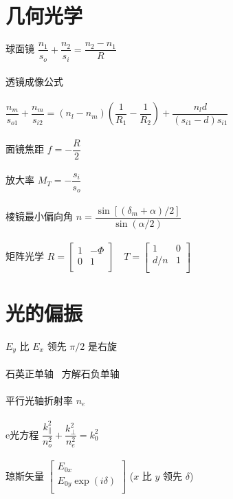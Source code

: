 \documentclass{article}
\begin{document}
\begin{multicols}{2}
\section{几何光学}

球面镜 $\dfrac{n_1}{s_o} + \dfrac{n_2}{s_i} = \dfrac{n_2 - n_1}{R}  $
\\\\
透镜成像公式
\\\\
$\dfrac{n_m}{s_{o1}} + \dfrac{n_m}{s_{i2}} = \left( n_l - n_m \right) \left( \dfrac{1}{R_1} - \dfrac{1}{R_2}   \right) + \dfrac{n_l d}{\left( s_{i1} - d \right)s_{i1}}   $
\\\\
面镜焦距 $f = - \dfrac{R}{2} $
\\\\
放大率 $M_T = - \dfrac{s_i}{s_o} $
\\\\
棱镜最小偏向角 $n = \dfrac{\sin \left[ \left( \delta_m + \alpha \right) / 2 \right]}{\sin \left( \alpha / 2 \right)} $
\\\\
矩阵光学 $R = \left[
  \begin{array}{ccc}
   1 & - \Phi \\
   0 & 1 \\
  \end{array}
\right ]
\quad T = \left[
  \begin{array}{ccc}
   1 & 0 \\
   d/n & 1 \\
  \end{array}
\right ]
$

\section{光的偏振}

$E_y$ 比 $E_x$ 领先 $\pi/2$ 是右旋
\\\\
石英正单轴 \ 方解石负单轴
\\\\
平行光轴折射率 $n_e$
\\\\
e光方程 $\dfrac{k_{\parallel}^2}{n_o^2} + \dfrac{k_{\perp}^2}{n_e^2} = k_0^2  $
\\\\
琼斯矢量 $\left[
  \begin{array}{cc}
   E_{0x} \\
   E_{0y} \exp \left( i \delta \right)  \\
  \end{array}
\right ]
$ ($x$ 比 $y$ 领先 $\delta$)


\end{multicols}
\end{document}
